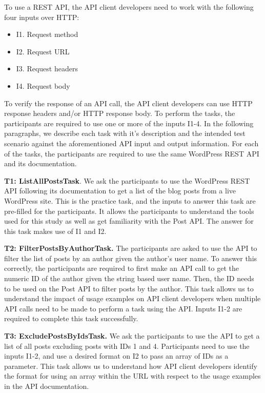 \documentclass[conference]{IEEEtran}
\begin{document}
To use a REST API, the API client developers need to work with the following four inputs over HTTP:

\begin{itemize}
  \item I1. Request method
  \item I2. Request URL
  \item I3. Request headers
  \item I4. Request body
\end{itemize}

To verify the response of an API call, the API client developers can use HTTP response headers and/or HTTP response body. To perform the tasks, the participants are required to use one or more of the inputs I1-4. In the following paragraphs, we describe each task with it's description and the intended test scenario against the aforementioned API input and output information. For each of the tasks, the participants are required to use the same WordPress REST API and its documentation.

\textbf{T1: ListAllPostsTask}. We ask the participants to use the WordPress REST API following its documentation to get a list of the blog posts from a live WordPress site. This is the practice task, and the inputs to answer this task are pre-filled for the participants. It allows the participants to understand the tools used for this study as well as get familiarity with the Post API. The answer for this task makes use of I1 and I2.

\textbf{T2: FilterPostsByAuthorTask.} The participants are asked to use the API to filter the list of posts by an author given the author's user name. To answer this correctly, the participants are required to first make an API call to get the numeric ID of the author given the string based user name. Then, the ID needs to be used on the Post API to filter posts by the author. This task allows us to understand the impact of usage examples on API client developers when multiple API calls need to be made to perform a task using the API. Inputs I1-2 are required to complete this task successfully.

\textbf{T3: ExcludePostsByIdsTask.} We ask the participants to use the API to get a list of all posts excluding posts with IDs 1 and 4. Participants need to use the inputs I1-2, and use a desired format on I2 to pass an array of IDs as a parameter. This task allows us to understand how API client developers identify the format for using an array within the URL with respect to the usage examples in the API documentation.
\end{document}
